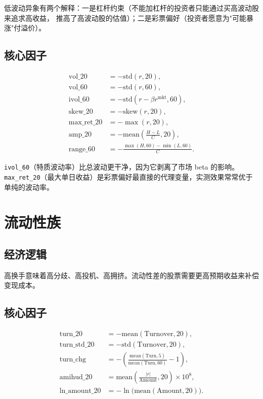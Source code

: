 低波动异象有两个解释：一是杠杆约束（不能加杠杆的投资者只能通过买高波动股来追求高收益，
推高了高波动股的估值）；二是彩票偏好（投资者愿意为"可能暴涨"付溢价）。

\subsection{核心因子}

\begin{align}
  \text{vol\_20} &= -\mathrm{std}(r, 20), \\
  \text{vol\_60} &= -\mathrm{std}(r, 60), \\
  \text{ivol\_60} &= -\mathrm{std}(r - \beta r^{\text{mkt}}, 60), \\
  \text{skew\_20} &= -\mathrm{skew}(r, 20), \\
  \text{max\_ret\_20} &= -\max(r, 20), \\
  \text{amp\_20} &= -\mathrm{mean}\!\left(\frac{H-L}{C}, 20\right), \\
  \text{range\_60} &= -\frac{\max(H,60) - \min(L,60)}{C}.
\end{align}

\texttt{ivol\_60}（特质波动率）比总波动更干净，因为它剥离了市场 beta 的影响。
\texttt{max\_ret\_20}（最大单日收益）是彩票偏好最直接的代理变量，实测效果常常优于
单纯的波动率。

\section{流动性族}

\subsection{经济逻辑}

高换手意味着高分歧、高投机、高拥挤。流动性差的股票需要更高预期收益来补偿变现成本。

\subsection{核心因子}

\begin{align}
  \text{turn\_20} &= -\mathrm{mean}(\text{Turnover}, 20), \\
  \text{turn\_std\_20} &= -\mathrm{std}(\text{Turnover}, 20), \\
  \text{turn\_chg} &= -\left(\frac{\mathrm{mean}(\text{Turn},5)}{\mathrm{mean}(\text{Turn},60)} - 1\right), \\
  \text{amihud\_20} &= \mathrm{mean}\!\left(\frac{|r|}{\text{Amount}}, 20\right)\times 10^8, \\
  \text{ln\_amount\_20} &= -\ln\big(\mathrm{mean}(\text{Amount}, 20)\big).
\end{align}

